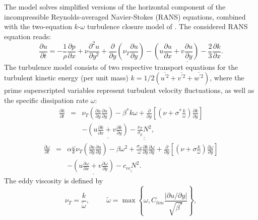 \documentclass[12pt]{article}
\begin{document}
The model solves simplified versions of the horizontal component of
the incompressible Reynolds-averaged Navier-Stokes (RANS) equations,
combined with the two-equation $k$-$\omega$ turbulence closure model
of \cite{Wilcox2006}.  The considered RANS equation reads:
%
\begin{equation}
\frac{\partial u}{\partial t} = 
-\frac{1}{\rho}\frac{\partial p}{\partial x} %
+ \nu\frac{\partial^2 u}{\partial y^2} %
+ \frac{\partial}{\partial y}\left(\nu_T \frac{\partial u}{\partial
    y}\right) %
-\underline{
 \left( u\frac{\partial u}{\partial x} + v\frac{\partial u}{\partial
    y} \right) %
- \frac{2}{3}\frac{\partial k}{\partial x}
}.
\label{eqn:u}
\end{equation}
%
The turbulence model consists of two respective transport equations
for the turbulent kinetic energy (per unit mass)
$k=1/2(\overline{u^{\prime2}} + \overline{v^{\prime2}} +
\overline{w^{\prime2}})$, where the prime superscripted variables
represent turbulent velocity fluctuations, as well as the specific
dissipation rate $\omega$:
%
\begin{eqnarray}
\frac{\partial k}{\partial t} & = &
\nu_T\left(\frac{\partial u}{\partial y}\frac{\partial u}{\partial y}\right)
- \beta^* k \omega 
+ \frac{\partial}{\partial y}\left[
\left(\nu + \sigma^*\frac{k}{\omega} \right) \frac{\partial k}{\partial
y}  \right]
\nonumber
\\
&&-\underline{
 \left( u\frac{\partial k}{\partial x} + v\frac{\partial k}{\partial
    y} \right)
}-
\underline{\underline{\frac{\nu_T}{\sigma_p}N^2}},
\label{eqn:k}
\end{eqnarray}
%
\begin{eqnarray}
\frac{\partial \omega}{\partial t} & = &
\alpha\frac{\omega}{k}\nu_T\left(\frac{\partial u}{\partial y}\frac{\partial u}{\partial y}\right)
- \beta \omega^2
+ \frac{\sigma_d}{\omega}\frac{\partial k}{\partial y}\frac{\partial\omega}{\partial y}
+ \frac{\partial}{\partial y}\left[
\left(\nu + \sigma\frac{k}{\omega} \right) \frac{\partial\omega}{\partial
y}  \right]
\nonumber
\\
&&-\underline{
 \left( u\frac{\partial\omega}{\partial x} + v\frac{\partial\omega}{\partial
    y} \right)
}-\underline{\underline{c_{e\epsilon}N^2}}.
\label{eqn:omega}
\end{eqnarray}
%
The eddy viscosity is defined by
%
\begin{equation}
\nu_T = \frac{k}{\tilde{\omega}},
\hspace{1cm}
\tilde{\omega} = \max \left\{\omega, C_{lim}\frac{\left|\partial
      u/\partial y \right|}{\sqrt{\beta^*}}\right\},
\label{eqn:nuT}
\end{equation}
\end{document}
